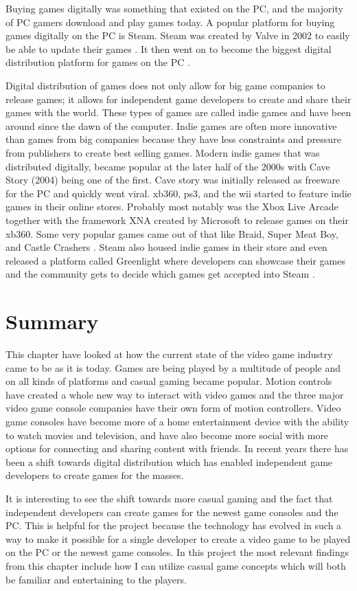 Buying games digitally was something that existed on the PC, and the majority of PC gamers download and play games today. A popular platform for buying games digitally on the PC is Steam. Steam was created by Valve in 2002 to easily be able to update their games \cite{2012eurogamer}. It then went on to become the biggest digital distribution platform for games on the PC \cite{2009gamasutra}.

Digital distribution of games does not only allow for big game companies to release games; it allows for independent game developers to create and share their games with the world. These types of games are called indie games and have been around since the dawn of the computer. Indie games are often more innovative than games from big companies because they have less constraints and pressure from publishers to create best selling games. Modern indie games that was distributed digitally, became popular at the later half of the 2000s with Cave Story (2004) being one of the first. Cave story was initially released as freeware for the PC and quickly went viral. \gls{xb360}, \gls{ps3}, and the \gls{wii} started to feature indie games in their online stores. Probably most notably was the Xbox Live Arcade together with the framework XNA created by Microsoft to release games on their \gls{xb360}. Some very popular games came out of that like Braid, Super Meat Boy, and Castle Crashers \cite{2015eurogamer}. Steam also housed indie games in their store and even released a platform called Greenlight where developers can showcase their games and the community gets to decide which games get accepted into Steam \cite{2015watlington}.

\section{Summary}
This chapter have looked at how the current state of the video game industry came to be as it is today. Games are being played by a multitude of people and on all kinds of platforms and casual gaming became popular.
Motion controls have created a whole new way to interact with video games and the three major video game console companies have their own form of motion controllers.
Video game consoles have become more of a home entertainment device with the ability to watch movies and television, and have also become more social with more options for connecting and sharing content with friends. 
In recent years there has been a shift towards digital distribution which has enabled independent game developers to create games for the masses.

It is interesting to see the shift towards more casual gaming and the fact that independent developers can create games for the newest game consoles and the PC. This is helpful for the project because the technology has evolved in such a way to make it possible for a single developer to create a video game to be played on the PC or the newest game consoles. In this project the most relevant findings from this chapter include how I can utilize casual game concepts which will both be familiar and entertaining to the players.
